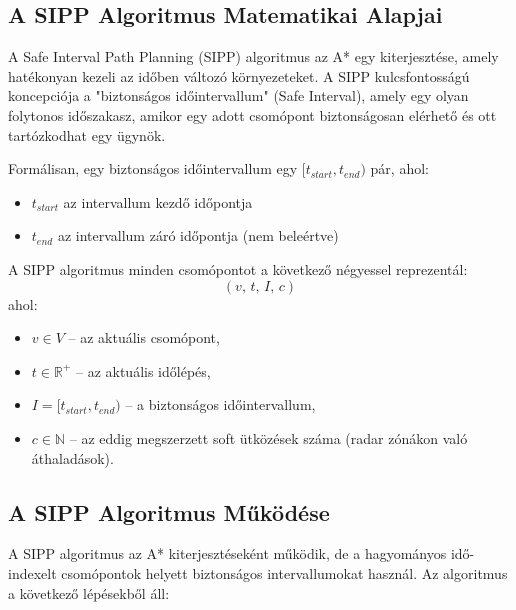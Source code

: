 \documentclass[a4paper,12pt]{article}
\begin{document}
\subsection{A SIPP Algoritmus Matematikai Alapjai}

A Safe Interval Path Planning (SIPP) algoritmus az A* egy kiterjesztése, amely hatékonyan kezeli az időben változó környezeteket. A SIPP kulcsfontosságú koncepciója a "biztonságos időintervallum" (Safe Interval), amely egy olyan folytonos időszakasz, amikor egy adott csomópont biztonságosan elérhető és ott tartózkodhat egy ügynök.

Formálisan, egy biztonságos időintervallum egy $[t_{start}, t_{end})$ pár, ahol:
\begin{itemize}
    \item $t_{start}$ az intervallum kezdő időpontja
    \item $t_{end}$ az intervallum záró időpontja (nem beleértve)
\end{itemize}

A SIPP algoritmus minden csomópontot a következő négyessel reprezentál:
\[
(v,\, t,\, I,\, c)
\]
ahol:
\begin{itemize}
    \item $v \in V$ – az aktuális csomópont,
    \item $t \in \mathbb{R}^+$ – az aktuális időlépés,
    \item $I = [t_{start}, t_{end})$ – a biztonságos időintervallum,
    \item $c \in \mathbb{N}$ – az eddig megszerzett soft ütközések száma (radar zónákon való áthaladások).
\end{itemize}

\subsection{A SIPP Algoritmus Működése}

A SIPP algoritmus az A* kiterjesztéseként működik, de a hagyományos idő-indexelt csomópontok helyett biztonságos intervallumokat használ. Az algoritmus a következő lépésekből áll:
\end{document}
